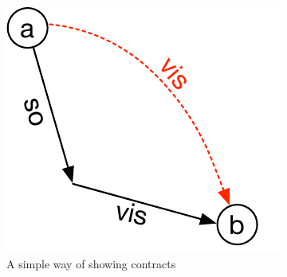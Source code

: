 \begin{figure}[h]
\includegraphics[scale=0.6]{../Figures/MR.pdf}
\caption{A simple way of showing contracts}
\label{fig:ctrt}
\end{figure}

